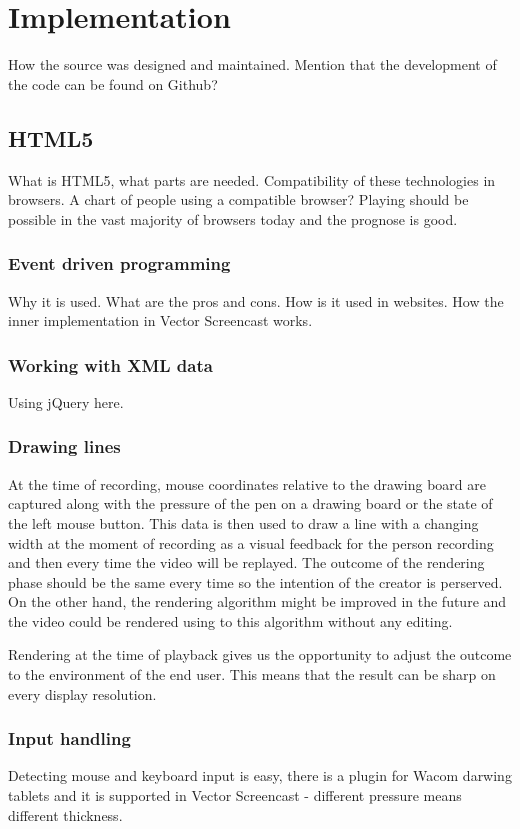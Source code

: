 \chapter{Implementation}
How the source was designed and maintained. Mention that the development of the code can be found on Github?

\section{HTML5}
What is HTML5, what parts are needed. Compatibility of these technologies in browsers. A chart of people using a compatible browser? Playing should be possible in the vast majority of browsers today and the prognose is good.

\subsection{Event driven programming}
Why it is used. What are the pros and cons. How is it used in websites. How the inner implementation in Vector Screencast works.

\subsection{Working with XML data}
Using jQuery here.

\subsection{Drawing lines}
At the time of recording, mouse coordinates relative to the drawing board are captured along with the pressure of the pen on a drawing board or the state of the left mouse button. This data is then used to draw a line with a changing width at the moment of recording as a visual feedback for the person recording and then every time the video will be replayed. The outcome of the rendering phase should be the same every time so the intention of the creator is perserved. On the other hand, the rendering algorithm might be improved in the future and the video could be rendered using to this algorithm without any editing.

Rendering at the time of playback gives us the opportunity to adjust the outcome to the environment of the end user. This means that the result can be sharp on every display resolution.



\subsection{Input handling}
Detecting mouse and keyboard input is easy, there is a plugin for Wacom darwing tablets and it is supported in Vector Screencast - different pressure means different thickness.